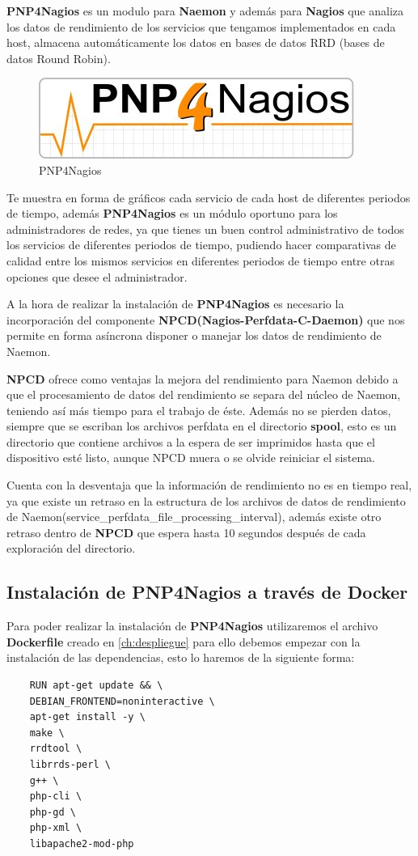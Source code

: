 \textbf{PNP4Nagios} \cite{pnp4nagios} es un modulo para \textbf{Naemon} y además para \textbf{Nagios} que analiza los datos de rendimiento de los servicios que tengamos implementados en cada host, almacena automáticamente los datos en bases de datos RRD (bases de datos Round Robin).
\newpage

\begin{figure}[H]
	\centering
	\includegraphics[scale=0.8]{imagenes/modelado/Pnp4nagios_logo.jpg}
	\caption{PNP4Nagios} \label{pnp4nagios}
\end{figure}

Te muestra en forma de gráficos cada servicio de cada host de diferentes periodos de tiempo, además \textbf{PNP4Nagios} es un módulo oportuno para los administradores de redes, ya que tienes un buen control administrativo de todos los servicios de diferentes periodos de tiempo, pudiendo hacer comparativas de calidad entre los mismos servicios en diferentes periodos de tiempo entre otras opciones que desee el administrador.

A la hora de realizar la instalación de \textbf{PNP4Nagios} es necesario la incorporación del componente \textbf{NPCD(Nagios-Perfdata-C-Daemon)} que nos permite en forma asíncrona disponer o manejar los datos de rendimiento de Naemon.

\textbf{NPCD} ofrece como ventajas la mejora del rendimiento para Naemon debido a que el procesamiento de datos del rendimiento se separa del núcleo de Naemon, teniendo así más tiempo para el trabajo de éste. Además no se pierden datos, siempre que se escriban los archivos perfdata en el directorio \textbf{spool}, esto es un directorio que contiene archivos a la espera de ser imprimidos hasta que el dispositivo esté listo, aunque NPCD muera o se olvide reiniciar el sistema.

Cuenta con la desventaja que la información de rendimiento no es en tiempo real, ya que existe un retraso en la estructura de los archivos de datos de rendimiento de Naemon(service\_perfdata\_file\_processing\_interval), además existe otro retraso dentro de \textbf{NPCD} que espera hasta 10 segundos después de cada exploración del directorio.
\newpage
\subsection{Instalación de PNP4Nagios a través de Docker}
Para poder realizar la instalación de \textbf{PNP4Nagios} utilizaremos el archivo \textbf{Dockerfile} creado en \ref{ch:despliegue} para ello debemos empezar con la instalación de las dependencias, esto lo haremos de la siguiente forma:
\begin{lstlisting}
	RUN apt-get update && \
	DEBIAN_FRONTEND=noninteractive \
	apt-get install -y \
	make \
	rrdtool \
	librrds-perl \    
	g++ \
	php-cli \
	php-gd \
	php-xml \
	libapache2-mod-php	
\end{lstlisting}

